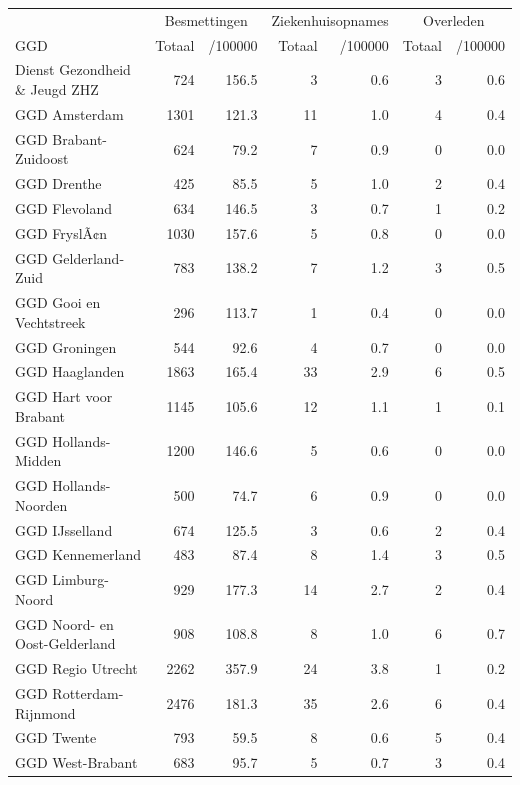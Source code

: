\documentclass[
  english,
  man,floatsintext]{apa6}
\begin{document}
\begin{table}
\centering\begingroup\fontsize{10}{12}\selectfont

\begin{threeparttable}
\begin{tabular}{lrrrrrr}
\toprule
\multicolumn{1}{c}{ } & \multicolumn{2}{c}{Besmettingen} & \multicolumn{2}{c}{Ziekenhuisopnames} & \multicolumn{2}{c}{Overleden} \\
\cmidrule(l{3pt}r{3pt}){2-3} \cmidrule(l{3pt}r{3pt}){4-5} \cmidrule(l{3pt}r{3pt}){6-7}
GGD & Totaal & /100000 & Totaal & /100000 & Totaal & /100000\\
\midrule
Dienst Gezondheid \& Jeugd ZHZ & 724 & 156.5 & 3 & 0.6 & 3 & 0.6\\
GGD Amsterdam & 1301 & 121.3 & 11 & 1.0 & 4 & 0.4\\
GGD Brabant-Zuidoost & 624 & 79.2 & 7 & 0.9 & 0 & 0.0\\
GGD Drenthe & 425 & 85.5 & 5 & 1.0 & 2 & 0.4\\
GGD Flevoland & 634 & 146.5 & 3 & 0.7 & 1 & 0.2\\
GGD FryslÃ¢n & 1030 & 157.6 & 5 & 0.8 & 0 & 0.0\\
GGD Gelderland-Zuid & 783 & 138.2 & 7 & 1.2 & 3 & 0.5\\
GGD Gooi en Vechtstreek & 296 & 113.7 & 1 & 0.4 & 0 & 0.0\\
GGD Groningen & 544 & 92.6 & 4 & 0.7 & 0 & 0.0\\
GGD Haaglanden & 1863 & 165.4 & 33 & 2.9 & 6 & 0.5\\
GGD Hart voor Brabant & 1145 & 105.6 & 12 & 1.1 & 1 & 0.1\\
GGD Hollands-Midden & 1200 & 146.6 & 5 & 0.6 & 0 & 0.0\\
GGD Hollands-Noorden & 500 & 74.7 & 6 & 0.9 & 0 & 0.0\\
GGD IJsselland & 674 & 125.5 & 3 & 0.6 & 2 & 0.4\\
GGD Kennemerland & 483 & 87.4 & 8 & 1.4 & 3 & 0.5\\
GGD Limburg-Noord & 929 & 177.3 & 14 & 2.7 & 2 & 0.4\\
GGD Noord- en Oost-Gelderland & 908 & 108.8 & 8 & 1.0 & 6 & 0.7\\
GGD Regio Utrecht & 2262 & 357.9 & 24 & 3.8 & 1 & 0.2\\
GGD Rotterdam-Rijnmond & 2476 & 181.3 & 35 & 2.6 & 6 & 0.4\\
GGD Twente & 793 & 59.5 & 8 & 0.6 & 5 & 0.4\\
GGD West-Brabant & 683 & 95.7 & 5 & 0.7 & 3 & 0.4\\

\end{tabular}
\end{threeparttable}
\end{table}
\end{document}
